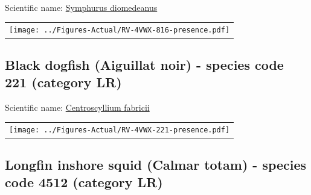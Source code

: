 \documentclass[12pt]{article}\usepackage[]{graphicx}\usepackage[]{color}
\begin{document}

Scientific name: \href{http://www.marinespecies.org/aphia.php?p=taxdetails\&id=159358}{Symphurus diomedeanus} \newline
\begin{minipage}{1.0\textwidth}
 \begin{tabular}{c}
\texttt{[image: ../Figures-Actual/RV-4VWX-816-presence.pdf]} \\ 
\end{tabular} 
\end{minipage}
\clearpage

\renewcommand\thefigure{\thesubsection\Alph{figure}}

\setcounter{figure}{0}

\hypertarget{sec:221}{%
\subsection{Black dogfish (Aiguillat noir) - species code 221 (category LR)}\label{sec:221}}

  


Scientific name: \href{http://www.marinespecies.org/aphia.php?p=taxdetails\&id=105906}{Centroscyllium fabricii} \newline
\begin{minipage}{1.0\textwidth}
 \begin{tabular}{c}
\texttt{[image: ../Figures-Actual/RV-4VWX-221-presence.pdf]} \\ 
\end{tabular} 
\end{minipage}
\clearpage

\renewcommand\thefigure{\thesubsection\Alph{figure}}

\setcounter{figure}{0}

\hypertarget{sec:4512}{%
\subsection{Longfin inshore squid (Calmar totam) - species code 4512 (category LR)}\label{sec:4512}}

  
\end{document}
